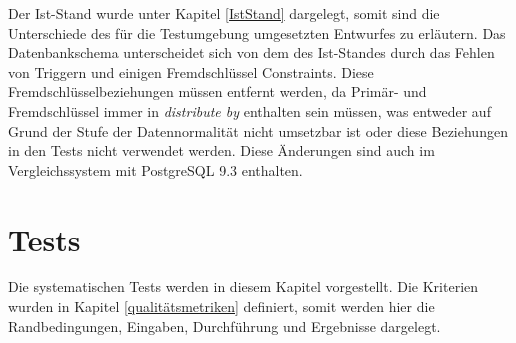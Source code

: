 Der Ist-Stand wurde unter Kapitel \ref{IstStand} dargelegt, somit sind die Unterschiede des für die Testumgebung umgesetzten Entwurfes zu erläutern.
Das Datenbankschema unterscheidet sich von dem des Ist-Standes durch das Fehlen von Triggern und einigen Fremdschlüssel Constraints.
Diese Fremdschlüsselbeziehungen müssen entfernt werden, da Primär- und Fremdschlüssel immer in \textit{distribute by} enthalten sein müssen, was entweder auf Grund der Stufe der Datennormalität nicht umsetzbar ist oder diese Beziehungen in den Tests nicht verwendet werden.
Diese Änderungen sind auch im Vergleichssystem mit PostgreSQL 9.3 enthalten.


\section{Tests}

Die systematischen Tests werden in diesem Kapitel vorgestellt.
Die Kriterien wurden in Kapitel \ref{qualitätsmetriken} definiert, somit werden hier die Randbedingungen, Eingaben, Durchführung und Ergebnisse dargelegt.

